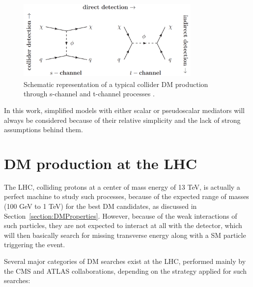 \documentclass[a4paper, 10pt, openright]{report}
\begin{document}
\begin{figure}[htbp]
\begin{center}
\includegraphics[width=9cm, height=4cm]{figs/STChannels.png}
\caption{Schematic representation of a typical collider \ac{DM} production through s-channel and t-channel processes \cite{STChannels}.}
\label{fig:STChannels}
\end{center}
\end{figure}

In this work, simplified models with either scalar or pseudoscalar mediators will always be considered because of their relative simplicity and the lack of strong assumptions behind them.%

\section{\ac{DM} production at the \ac{LHC}} \label{section:ourChannel}

The \ac{LHC}, colliding protons at a center of mass energy of 13 TeV, is actually a perfect machine to study such processes, because of the expected range of masses (100 GeV to 1 TeV) for the best \ac{DM} candidates, as discussed in Section~\ref{section:DMProperties}. However, because of the weak interactions of such particles, they are not expected to interact at all with the detector, which will then basically search for missing transverse energy along with a \ac{SM} particle triggering the event.

Several major categories of \ac{DM} searches exist at the \ac{LHC}, performed mainly by the \ac{CMS} and \ac{ATLAS} collaborations, depending on the strategy applied for such searches:
\end{document}
